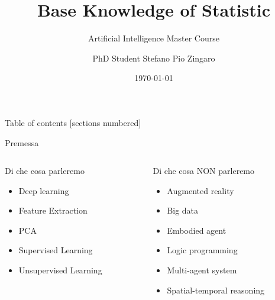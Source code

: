 \documentclass[10pt]{beamer}
\title{Base Knowledge of Statistic}
\subtitle{Artificial Intelligence Master Course}
\date{\today}
\author{PhD Student Stefano Pio Zingaro}
\institute{Department of Computer Science and Engineering \\ Universit\`a degli studi di Bologna}
\begin{document}
	\maketitle

	\begin{frame}{Table of contents}
		[sections numbered]
		\tableofcontents[hideallsubsections]
	\end{frame}


	\begin{frame}{Premessa}

		\begin{columns}
			
			\begin{column}{0.5\textwidth}

			   \begin{block}{Di che cosa parleremo}
       				
       				\begin{itemize}
       					
       					\item Deep learning
       					\item Feature Extraction
       					\item PCA
								\item Supervised Learning
       					\item Unsupervised Learning
       				
       				\end{itemize}
      			
      			\end{block}

			\end{column}

			\begin{column}{0.5\textwidth}
		    	
		    	\begin{block}{Di che cosa NON parleremo}

		        	\begin{itemize}
       					
       					\item Augmented reality
								\item \alert{Big data}
								\item Embodied agent
								\item Logic programming
								\item Multi-agent system
								\item Spatial-temporal reasoning
       				
       				\end{itemize}
		      	
		      	\end{block}

			\end{column}
		
		\end{columns}
	
	\end{frame}
\end{document}
